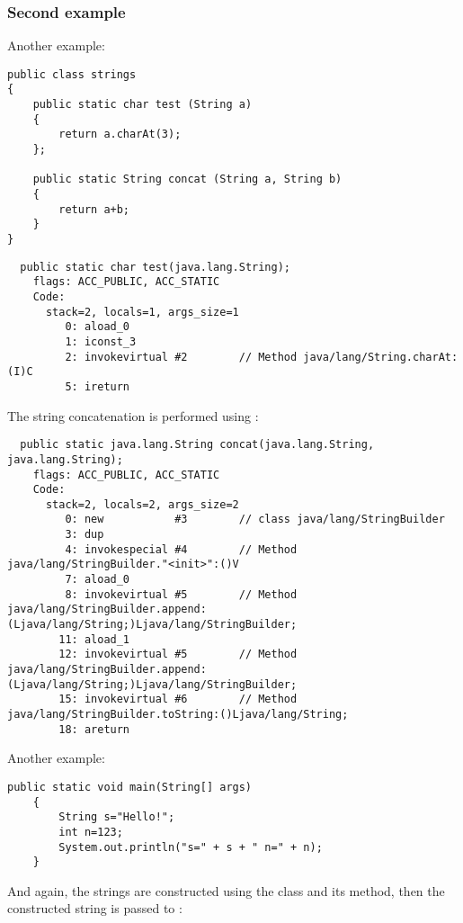 \subsubsection{Second example}

Another example:

\begin{lstlisting}[style=customjava]
public class strings
{
	public static char test (String a)
	{
		return a.charAt(3);
	};

	public static String concat (String a, String b)
	{
		return a+b;
	}
}
\end{lstlisting}

\begin{lstlisting}
  public static char test(java.lang.String);
    flags: ACC_PUBLIC, ACC_STATIC
    Code:
      stack=2, locals=1, args_size=1
         0: aload_0       
         1: iconst_3      
         2: invokevirtual #2        // Method java/lang/String.charAt:(I)C
         5: ireturn       
\end{lstlisting}
         
The string concatenation is performed using :


\begin{lstlisting}
  public static java.lang.String concat(java.lang.String, java.lang.String);
    flags: ACC_PUBLIC, ACC_STATIC
    Code:
      stack=2, locals=2, args_size=2
         0: new           #3        // class java/lang/StringBuilder
         3: dup           
         4: invokespecial #4        // Method java/lang/StringBuilder."<init>":()V
         7: aload_0       
         8: invokevirtual #5        // Method java/lang/StringBuilder.append:(Ljava/lang/String;)Ljava/lang/StringBuilder;
        11: aload_1       
        12: invokevirtual #5        // Method java/lang/StringBuilder.append:(Ljava/lang/String;)Ljava/lang/StringBuilder;
        15: invokevirtual #6        // Method java/lang/StringBuilder.toString:()Ljava/lang/String;
        18: areturn       
\end{lstlisting}

Another example:

\begin{lstlisting}[style=customjava]
	public static void main(String[] args)
	{
		String s="Hello!";
		int n=123;
		System.out.println("s=" + s + " n=" + n);
	}
\end{lstlisting}

And again, the strings are constructed using the  class and its  method,
then the constructed string is passed to :


